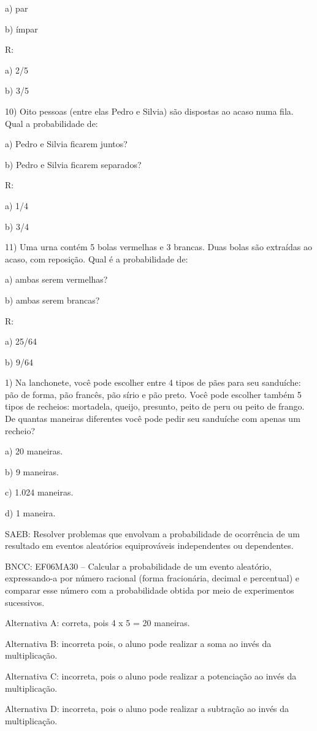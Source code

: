 a) par

b) ímpar

R:

a) 2/5

b) 3/5

10) Oito pessoas (entre elas Pedro e Silvia) são dispostas ao acaso numa
fila. Qual a probabilidade de:

a) Pedro e Silvia ficarem juntos?

b) Pedro e Silvia ficarem separados?

R:

a) 1/4

b) 3/4

11) Uma urna contém 5 bolas vermelhas e 3 brancas. Duas bolas são
extraídas ao acaso, com reposição. Qual é a probabilidade de:

a) ambas serem vermelhas?

b) ambas serem brancas?

R:

a) 25/64

b) 9/64


1) Na lanchonete, você pode escolher entre 4 tipos de pães para seu
sanduíche: pão de forma, pão francês, pão sírio e pão preto. Você pode
escolher também 5 tipos de recheios: mortadela, queijo, presunto, peito
de peru ou peito de frango. De quantas maneiras diferentes você pode
pedir seu sanduíche com apenas um recheio?

a) 20 maneiras.

b) 9 maneiras.

c) 1.024 maneiras.

d) 1 maneira.

SAEB: Resolver problemas que envolvam a probabilidade de ocorrência de
um resultado em eventos aleatórios equiprováveis independentes ou
dependentes.

BNCC: EF06MA30 -- Calcular a probabilidade de um evento aleatório,
expressando-a por número racional (forma fracionária, decimal e
percentual) e comparar esse número com a probabilidade obtida por meio
de experimentos sucessivos.

Alternativa A: correta, pois 4 x 5 = 20 maneiras.

Alternativa B: incorreta pois, o aluno pode realizar a soma ao invés da
multiplicação.

Alternativa C: incorreta, pois o aluno pode realizar a potenciação ao
invés da multiplicação.

Alternativa D: incorreta, pois o aluno pode realizar a subtração ao
invés da multiplicação.

